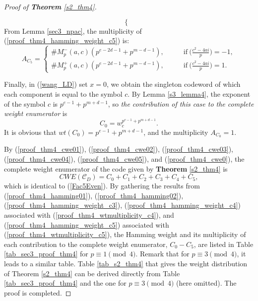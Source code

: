 \documentclass[final,1p,times]{elsarticle}
\begin{document}
\begin{proof}[Proof of \textbf{Theorem} \ref{s2_thm4}]
\begin{enumerate}[(I)]
\begin{equation}
\begin{cases}
\end{cases}
\end{equation}
From Lemma \ref{sec3_npac}, the multiplicity of (\ref{proof_thm4_hamming_weight_c5}) is:
\begin{equation}\label{proof_thm4_wtmultiplicity_c5}
A_{C_{5}}=
\begin{cases}
\#M_{p}^{-}(a,c) (p^{e-2d-1}+p^{m-d-1}),&\qquad\text{if}\ \biggl(\frac{c^{2}-4ai}{p}\biggr)=-1,\\
\#M_{p}^{+}(a,c) (p^{e-2d-1}+p^{m-d-1}),&\qquad\text{if}\ \biggl(\frac{c^{2}-4ai}{p}\biggr)=1.
\end{cases}
\end{equation}

Finally, in (\ref{wang_LD}) set $ x=0 $, we obtain the singleton codeword of which each component is equal to the symbol $ c $. By Lemma \ref{s3_lemma4}, the exponent of the symbol $ c $ is $p^{e-1}+p^{m+d-1}  $, so \textit{the contribution of this case to the complete weight enumerator} is 
\begin{equation}\label{proof_thm4_cwe0}
C_{0}=w_{c}^{p^{e-1}+p^{m+d-1}}.
\end{equation}
It is obvious that $ wt(C_{0})=p^{e-1}+p^{m+d-1} $, and the multiplicity  $ A_{C_{0}}=  1 $.
\end{enumerate}
By (\ref{proof_thm4_cwe01}), (\ref{proof_thm4_cwe02}), (\ref{proof_thm4_cwe03}), (\ref{proof_thm4_cwe04}),  (\ref{proof_thm4_cwe05}), and (\ref{proof_thm4_cwe0}), the complete weight enumerator of the code given by \textbf{Theorem} \ref{s2_thm4} is
\begin{equation*}
\mathit{CWE}(\mathcal{C}_{D})=C_{0}+C_{1}+C_{2}+C_{3}+C_{4}+C_{5},
\end{equation*}
which is identical to (\ref{Fac5Even}). By gathering the results from (\ref{proof_thm4_hamming01}), (\ref{proof_thm4_hamming02}), (\ref{proof_thm4_hamming_weight_c3}), (\ref{proof_thm4_hamming_weight_c4}) associated with (\ref{proof_thm4_wtmultiplicity_c4}), and (\ref{proof_thm4_hamming_weight_c5}) associated with (\ref{proof_thm4_wtmultiplicity_c5}), the Hamming weight and its multiplicity of each contribution to the complete weight enumerator, $ C_{0}-C_{5} $, are listed in Table \ref{tab_sec3_proof_thm4} for $ p\equiv 1\pmod 4 $. Remark that for $ p\equiv 3\pmod 4 $, it leads to a similar table. Table \ref{tab_s2_thm4} that gives the weight distribution of Theorem \ref{s2_thm4} can be derived directly from Table \ref{tab_sec3_proof_thm4} and the one for  $ p\equiv 3\pmod 4 $ (here omitted). The proof is completed.

\end{proof}
\end{document}
